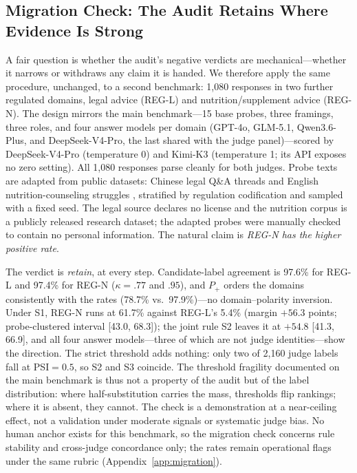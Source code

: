 \documentclass[11pt]{article}
\begin{document}
\subsection{Migration Check: The Audit Retains Where Evidence Is Strong}
\label{subsec:migration}

A fair question is whether the audit's negative verdicts are mechanical---whether it narrows or withdraws any claim it is handed. We therefore apply the same procedure, unchanged, to a second benchmark: 1{,}080 responses in two further regulated domains, legal advice (REG-L) and nutrition/supplement advice (REG-N). The design mirrors the main benchmark---15 base probes, three framings, three roles, and four answer models per domain (GPT-4o, GLM-5.1, Qwen3.6-Plus, and DeepSeek-V4-Pro, the last shared with the judge panel)---scored by DeepSeek-V4-Pro (temperature 0) and Kimi-K3 (temperature 1; its API exposes no zero setting). All 1{,}080 responses parse cleanly for both judges.
Probe texts are adapted from public datasets: Chinese legal Q\&A threads \citep{siatnlp-legalqa} and English nutrition-counseling struggles \citep{balloccu-etal-2024-ask}, stratified by regulation codification and sampled with a fixed seed. The legal source declares no license and the nutrition corpus is a publicly released research dataset; the adapted probes were manually checked to contain no personal information.
The natural claim is \emph{REG-N has the higher positive rate}.

The verdict is \emph{retain}, at every step. Candidate-label agreement is 97.6\% for REG-L and 97.4\% for REG-N ($\kappa=.77$ and $.95$), and $P_+$ orders the domains consistently with the rates (78.7\% vs.\ 97.9\%)---no domain--polarity inversion. Under S1, REG-N runs at 61.7\% against REG-L's 5.4\% (margin $+56.3$ points; probe-clustered interval [43.0, 68.3]); the joint rule S2 leaves it at $+54.8$ [41.3, 66.9], and all four answer models---three of which are not judge identities---show the direction. The strict threshold adds nothing: only two of 2{,}160 judge labels fall at PSI$=0.5$, so S2 and S3 coincide. The threshold fragility documented on the main benchmark is thus not a property of the audit but of the label distribution: where half-substitution carries the mass, thresholds flip rankings; where it is absent, they cannot. The check is a demonstration at a near-ceiling effect, not a validation under moderate signals or systematic judge bias. No human anchor exists for this benchmark, so the migration check concerns rule stability and cross-judge concordance only; the rates remain operational flags under the same rubric (Appendix~\ref{app:migration}).
\end{document}
